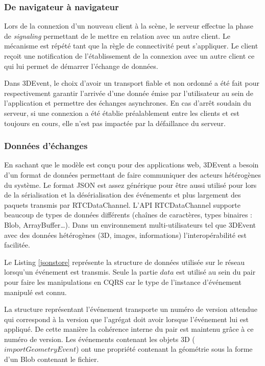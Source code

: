 \subsubsection{De navigateur à navigateur}
Lors de la connexion d'un nouveau client à la scène, le serveur effectue la phase 
de \textit{signaling} permettant de le mettre en relation avec un autre client. Le 
mécanisme est répété tant que la règle de connectivité peut s'appliquer. Le client 
reçoit une notification de l'établissement de la connexion avec un autre client ce 
qui lui permet de démarrer l'échange de données.

Dans 3DEvent, le choix d'avoir un transport fiable et non ordonné a été fait pour 
respectivement garantir l'arrivée d'une donnée émise par l'utilisateur au sein de 
l'application et permettre des échanges asynchrones.
En cas d'arrêt soudain du serveur, si une connexion a été établie préalablement 
entre les clients et est toujours en cours, elle n'est pas impactée par la défaillance 
du serveur.
\subsubsection{Données d'échanges}

En sachant que le modèle est conçu pour des applications web, 3DEvent a besoin 
d'un format de données permettant de faire communiquer des acteurs hétérogènes 
du système.
Le format \gls{JSON} est assez générique pour être aussi utilisé pour lors de la 
sérialisation et la désérialisation des 
événements et plus largement des paquets transmis par RTCDataChannel. 
L'\acrshort{API} RTCDataChannel supporte beaucoup de types de données 
différents (chaînes de caractères, types binaires : Blob, ArrayBuffer\dots). Dans 
un environnement multi-utilisateurs tel que 3DEvent avec des données 
hétérogènes (3D, images, 
informations) l'interopérabilité est facilitée.

Le Listing  \ref{jsonstore} représente la structure de données utilisée sur le réseau 
lorsqu'un événement est transmis. Seule la partie $data$ est utilisé au sein du pair 
pour faire les manipulations en \gls{CQRS} car le type de l'instance d'événement 
manipulé est connu. 

La structure représentant l'événement transporte un numéro de version \og 
attendue\fg{} 
qui correspond à la version que l'agrégat doit avoir lorsque l'événement lui est 
appliqué. De cette manière la cohérence interne du pair est maintenu grâce à ce 
numéro de version.
Les événements contenant les objets 3D ($importGeometryEvent$) ont une 
propriété contenant la géométrie sous la forme d'un Blob contenant le fichier. 

